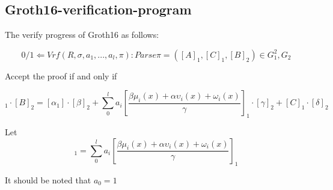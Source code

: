\subsection{Groth16-verification-program}

The verify progress of Groth16\cite{website:Groth16} as follows:

\begin{equation}
0/1 \Leftarrow Vrf(R,\sigma, a_{1},...,a_{l}, \pi): Parse \pi = ([A]_{1}, [C]_{1}, [B]_{2}) \in G_1^2, G_2
\end{equation}

Accept the proof if and only if

\begin{equation}
 [A]_1 \cdot [B]_2 = [\alpha_1] \cdot [\beta]_2 + \sum_{0}^{l}a_i[\frac{\beta\mu_i(x) + \alpha\upsilon_i(x) + \omega_i(x)}{\gamma}]_1 \cdot [\gamma]_2 + [C]_1 \cdot [\delta]_2  
\end{equation}


Let \begin{equation}  [msm]_1 = \sum_{0}^{l}a_i[\frac{\beta\mu_i(x) + \alpha\upsilon_i(x) + \omega_i(x)}{\gamma}]_1 \end{equation}



It should be noted that $a_0 = 1$ 
